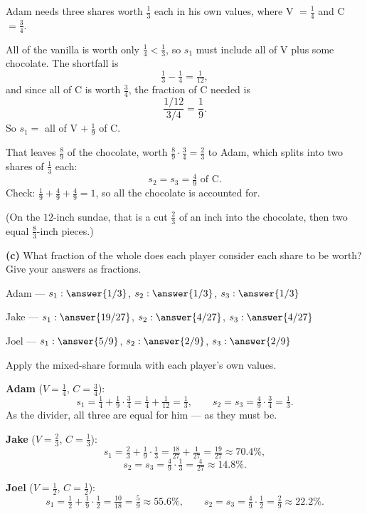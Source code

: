 \documentclass[12pt]{ximera}
\begin{document}
\begin{problem}
\begin{prompt}
\begin{feedback}
Adam needs three shares worth $\frac13$ each in his own values, where V $= \frac14$ and
C $= \frac34$.

All of the vanilla is worth only $\frac14 < \frac13$, so $s_1$ must include all of V
plus some chocolate. The shortfall is
\[ \tfrac13 - \tfrac14 = \tfrac{1}{12}, \]
and since all of C is worth $\frac34$, the fraction of C needed is
\[ \frac{1/12}{3/4} = \frac19. \]
So $s_1 =$ all of V $+\ \frac19$ of C.

That leaves $\frac89$ of the chocolate, worth $\frac89 \cdot \frac34 = \frac23$ to
Adam, which splits into two shares of $\frac13$ each:
\[ s_2 = s_3 = \tfrac49 \text{ of C}. \]
Check: $\frac19+\frac49+\frac49 = 1$, so all the chocolate is accounted for. \checkmark

(On the $12$-inch sundae, that is a cut $\frac23$ of an inch into the chocolate, then
two equal $\frac{8}{3}$-inch pieces.)
\end{feedback}
\end{prompt}

\begin{prompt}
\textbf{(c)} What fraction of the whole does each player consider each share to be
worth? Give your answers as fractions.

Adam --- $s_1: \answer{1/3}$, \quad $s_2: \answer{1/3}$, \quad $s_3: \answer{1/3}$

\smallskip
Jake --- $s_1: \answer{19/27}$, \quad $s_2: \answer{4/27}$, \quad $s_3: \answer{4/27}$

\smallskip
Joel --- $s_1: \answer{5/9}$, \quad $s_2: \answer{2/9}$, \quad $s_3: \answer{2/9}$

\begin{feedback}
Apply the mixed-share formula with each player's own values.

\textbf{Adam} ($V=\frac14$, $C=\frac34$):
\[ s_1 = \tfrac14 + \tfrac19\cdot\tfrac34 = \tfrac14+\tfrac{1}{12} = \tfrac13,
\qquad s_2 = s_3 = \tfrac49\cdot\tfrac34 = \tfrac13. \]
As the divider, all three are equal for him --- as they must be.

\textbf{Jake} ($V=\frac23$, $C=\frac13$):
\[ s_1 = \tfrac23 + \tfrac19\cdot\tfrac13 = \tfrac{18}{27}+\tfrac{1}{27} = \tfrac{19}{27} \approx 70.4\%, \]
\[ s_2 = s_3 = \tfrac49\cdot\tfrac13 = \tfrac{4}{27} \approx 14.8\%. \]

\textbf{Joel} ($V=\frac12$, $C=\frac12$):
\[ s_1 = \tfrac12 + \tfrac19\cdot\tfrac12 = \tfrac{10}{18} = \tfrac59 \approx 55.6\%,
\qquad s_2 = s_3 = \tfrac49\cdot\tfrac12 = \tfrac29 \approx 22.2\%. \]


\end{feedback}
\end{prompt}
\end{problem}
\end{document}

